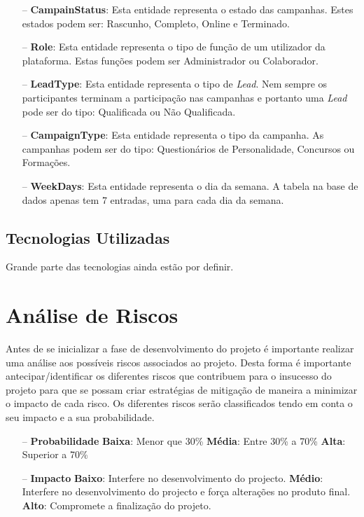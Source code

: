 \begin{itemize}
	\item[--] \textbf{CampainStatus}: Esta entidade representa o estado das campanhas. Estes estados podem ser: Rascunho, Completo, Online e Terminado.
	\item[--] \textbf{Role}: Esta entidade representa o tipo de função de um utilizador da plataforma. Estas funções podem ser Administrador ou Colaborador.
	\item[--] \textbf{LeadType}: Esta entidade representa o tipo de \textit{Lead}. Nem sempre os participantes terminam a participação nas campanhas e portanto uma \textit{Lead} pode ser do tipo: Qualificada ou Não Qualificada.
	\item[--] \textbf{CampaignType}: Esta entidade representa o tipo da campanha. As campanhas podem ser do tipo: Questionários de Personalidade, Concursos ou Formações. 
	\item[--] \textbf{WeekDays}: Esta entidade representa o dia da semana. A tabela na base de dados apenas tem 7 entradas, uma para cada dia da semana.
\end{itemize}


\subsection{Tecnologias Utilizadas}

Grande parte das tecnologias ainda estão por definir. 

\section{Análise de Riscos}
\label{analiseriscos}

Antes de se inicializar a fase de desenvolvimento do projeto é importante realizar uma análise aos possíveis riscos associados ao projeto. Desta forma é importante antecipar/identificar os diferentes riscos que contribuem para o insucesso do projeto para que se possam criar estratégias de mitigação de maneira a minimizar o impacto de cada risco. Os diferentes riscos serão classificados tendo em conta o seu impacto e a sua probabilidade.

\begin{itemize}
	\item[--] \textbf{Probabilidade}
		\subitem \textbf{Baixa}: Menor que 30\%
		\subitem \textbf{Média}: Entre 30\% a 70\%
		\subitem \textbf{Alta}: Superior a 70\%
	\item[--] \textbf{Impacto}
		\subitem \textbf{Baixo}: Interfere no desenvolvimento do projecto.
		\subitem \textbf{Médio}: Interfere no desenvolvimento do projecto e força alterações no produto final.
		\subitem \textbf{Alto}: Compromete a finalização do projeto.
\end{itemize}

